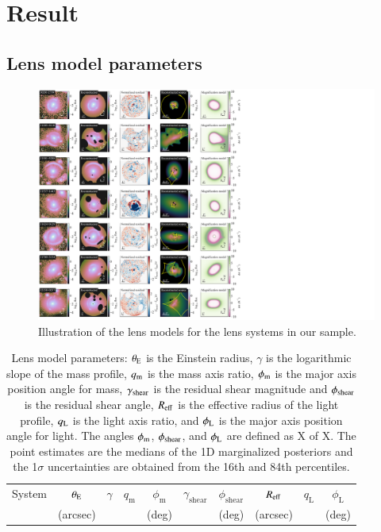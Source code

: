 \documentclass{aa}
\begin{document}
\section{Result} \label{sec:result}

\subsection{Lens model parameters}

\begin{figure}
	\centering
	\includegraphics[width=1.55\textwidth]{figures/lens_models.pdf}
	\caption{\label{fig:lens_models}
	Illustration of the lens models for the lens systems in our sample.
	}
\end{figure}

\renewcommand{\arraystretch}{1.3}
 \begin{table}
 \caption{Lens model parameters: $\theta_{\rm E}$ is the Einstein radius, $\gamma$ is the logarithmic slope of the mass profile, $q_{\rm m}$ is the mass axis ratio, $\phi_{\rm m}$ is the major axis position angle for mass,  $\gamma_{\rm shear}$ is the residual shear magnitude and $\phi_{\rm shear}$ is the residual shear angle,
 $R_{\rm eff}$ is the effective radius of the light profile,  $q_{\rm L}$ is the light axis ratio, and $\phi_{\rm L}$ is the major axis position angle for light. The angles $\phi_{\rm m}$, $\phi_{\rm shear}$, and $\phi_{\rm L}$ are defined as X of X. The point estimates are the medians of the 1D marginalized posteriors and the 1$\sigma$ uncertainties are obtained from the 16th and 84th percentiles.
\label{table:lens_params}
}
\centering
\begin{tabular}{lccccccccc}
\hline
     System &  $\theta_{\rm E}$ &    $\gamma$ &    $q_\text{m}$ &     $\phi_\text{m}$ &  $\gamma_\text{shear}$  &  $\phi_\text{shear}$  &
     $R_{\rm eff} $ & 
     $q_\text{L}$ & 
     $\phi_\text{L}$
     \\
     & (arcsec) & & &(deg)   & & (deg) & (arcsec) & & (deg) \\
\hline
 
\end{tabular}
\end{table}
\end{document}
